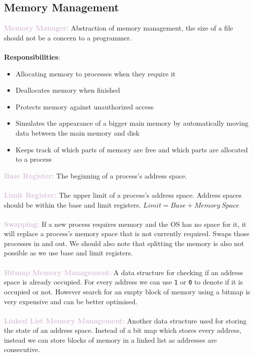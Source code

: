 \documentclass[a4paper,10pt]{article}
\begin{document}
\subsection*{Memory Management}
\textcolor{Thistle}{\textbf{Memory Manager:}} Abstraction of memory management, the size of a file should not be a concern to a programmer. \\\\
\textbf{Responsibilities}: 
\begin{itemize}
\item Allocating memory to processes when they require it 
\item Deallocates memory when finished 
\item Protects memory against unauthorized access 
\item Simulates the appearance of a bigger main memory by automatically moving data between the main memory and disk 
\item Keeps track of which parts of memory are free and which parts are allocated to a process 
\end{itemize}
\textcolor{Thistle}{\textbf{Base Register:}} The beginning of a process's address space. \\\\
\textcolor{Thistle}{\textbf{Limit Register:}} The upper limit of a process's address space. Address spaces should be within the base and limit registers. $Limit = Base + Memory \ Space$ \\\\
\textcolor{Thistle}{\textbf{Swapping:}} If a new process requires memory and the OS has no space for it, it will replace a process's memory space that is not currently required. Swaps those processes in and out.  We should also note that splitting the memory is also not possible as we use base and limit registers. \\\\
\textcolor{Thistle}{\textbf{Bitmap Memory Management:}} A data structure for checking if an address space is already occupied. For every address we can use \texttt{1} or \texttt{0} to denote if it is occupied or not. However search for an empty block of memory using a bitmap is very expensive and can be better optimised. \\\\
\textcolor{Thistle}{\textbf{Linked List Memory Management: }} Another data structure used for storing the state of an address space. Instead of a bit map which stores every address, instead we can store blocks of memory in a linked list as addresses are consecutive.  \\\\
\end{document}
